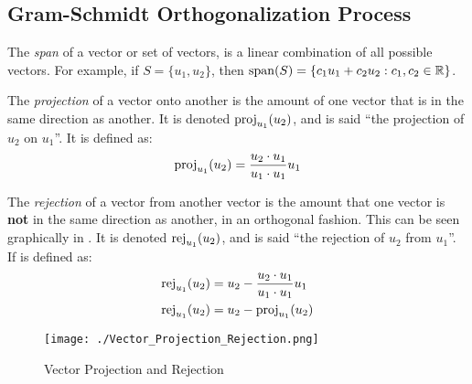 \subsection{Gram-Schmidt Orthogonalization Process}\label{subsec:Gram-Schmidt_Orthogonalization}
\begin{definition}[Span]\label{def:Span}
  The \emph{span} of a vector or set of vectors, is a linear combination of all possible vectors.
  For example, if $S = \lbrace u_{1}, u_{2} \rbrace$, then $\Span(S) = \lbrace c_{1}u_{1} + c_{2}u_{2} : c_{1}, c_{2} \in \RealNumbers \rbrace$.
\end{definition}

\begin{definition}[Projection]\label{def:Vector_Projection}
  The \emph{projection} of a vector onto another is the amount of one vector that is in the same direction as another.
  It is denoted $\Proj{u_{2}}{u_{1}}$, and is said ``the projection of $u_{2}$ on $u_{1}$''.
  It is defined as:
  \begin{equation}\label{eq:Vector_Projection}
    \Proj{u_{2}}{u_{1}} = \frac{u_{2} \cdot u_{1}}{u_{1} \cdot u_{1}} u_{1}
  \end{equation}
\end{definition}

\begin{definition}[Rejection]\label{def:Vector_Rejection}
  The \emph{rejection} of a vector from another vector is the amount that one vector is \textbf{not} in the same direction as another, in an orthogonal fashion.
  This can be seen graphically in .
  It is denoted $\Rej{u_{2}}{u_{1}}$, and is said ``the rejection of $u_{2}$ from $u_{1}$''.
  If is defined as:
  \begin{equation}\label{eq:Vector_Rejection}
    \begin{aligned}
      \Rej{u_{2}}{u_{1}} &= u_{2} - \frac{u_{2} \cdot u_{1}}{u_{1} \cdot u_{1}} u_{1} \\
      \Rej{u_{2}}{u_{1}} &= u_{2} - \Proj{u_{2}}{u_{1}}
    \end{aligned}
  \end{equation}
\end{definition}

\begin{figure}[h!tbp]
  \centering
  \texttt{[image: ./Vector\_Projection\_Rejection.png]}
  \caption{Vector Projection and Rejection}
  \label{fig:Vector_Projection_Rejection}
\end{figure}


